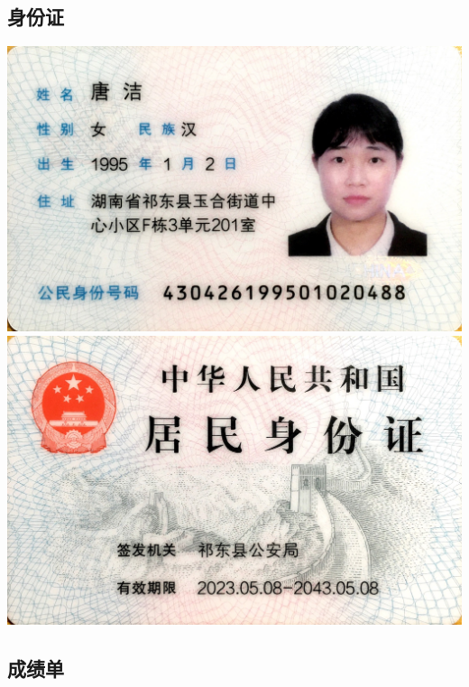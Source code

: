 \documentclass[UFT8]{ctexart}%
\begin{document}
\subsection{身份证}
\begin{center}
  \includegraphics[scale=0.12]{figs/身份证1.JPG }
  \includegraphics[scale=0.12]{figs/身份证2.JPG }
\end{center}

\subsection{成绩单}

%
%
\end{document}
